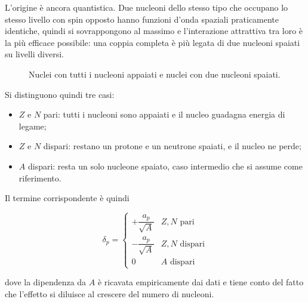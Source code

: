 L'origine è ancora quantistica. Due nucleoni dello stesso tipo che occupano lo stesso livello con spin opposto hanno funzioni d'onda spaziali praticamente identiche, quindi si sovrappongono al massimo e l'interazione attrattiva tra loro è la più efficace possibile: una coppia completa è più legata di due nucleoni spaiati su livelli diversi. 

\begin{figure}[htbp]
\centering
{}
\caption{Nuclei con tutti i nucleoni appaiati e nuclei con due nucleoni spaiati.}
\label{fig:pairing}
\end{figure}

Si distinguono quindi tre casi:
\begin{itemize}
    \item $Z$ e $N$ pari: tutti i nucleoni sono appaiati e il nucleo guadagna energia di legame;
    \item $Z$ e $N$ dispari: restano un protone e un neutrone spaiati, e il nucleo ne perde;
    \item $A$ dispari: resta un solo nucleone spaiato, caso intermedio che si assume come riferimento.
\end{itemize}
Il termine corrispondente è quindi
%
\begin{tcolorbox}[colback=black!5!white, colframe=black!45!white, boxrule=0.8pt]
\begin{equation}
    \delta_p =
    \begin{cases}
        + \dfrac{a_p}{\sqrt{A}} & Z, N \text{ pari} \\[8pt]
        - \dfrac{a_p}{\sqrt{A}} & Z, N \text{ dispari} \\[8pt]
        0 & A \text{ dispari}
    \end{cases}
\end{equation}
\end{tcolorbox}
dove la dipendenza da $A$ è ricavata empiricamente dai dati e tiene conto del fatto che l'effetto si diluisce al crescere del numero di nucleoni. 


